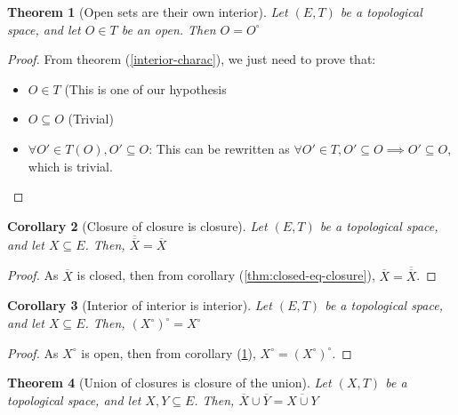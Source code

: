 \documentclass{article}
\newtheorem{theorem}{Theorem}[section]
\newtheorem{corollary}[theorem]{Corollary}
\theoremstyle{definition}
\theoremstyle{remark}
\theoremstyle{example}
\theoremstyle{notation}
\newcommand{\inter}[1]{{{#1}^\circ}}
\begin{document}
\begin{theorem}[Open sets are their own interior] \label{thm:open-eq-interior}
		Let $(E, T)$ be a topological space, and let $O \in T$ be an open. Then $O = \inter{O}$
\end{theorem}

\begin{proof}
		From theorem (\ref{interior-charac}), we just need to prove that:
		\begin{itemize}
				\item $O \in T$ (This is one of our hypothesis
				\item $O \subseteq O$ (Trivial)
				\item $\forall O' \in T(O), O' \subseteq O$: This can be rewritten as $\forall O' \in T, O' \subseteq O \implies O' \subseteq O$, which is trivial.
		\end{itemize}
\end{proof}

\begin{corollary}[Closure of closure is closure]
		Let $(E, T)$ be a topological space, and let $X \subseteq E$. Then, $\overline{\overline{X}} = \overline{X}$ 
\end{corollary}

\begin{proof}
		As $\overline{X}$ is closed, then from corollary (\ref{thm:closed-eq-closure}), $\overline{X} = \overline{\overline{X}}$.
\end{proof}

\begin{corollary}[Interior of interior is interior]
		Let $(E, T)$ be a topological space, and let $X \subseteq E$. Then, $\inter{(\inter{X})} = \inter{X}$
\end{corollary}

\begin{proof}
		As $\inter{X}$ is open, then from corollary (\ref{thm:open-eq-interior}), $\inter{X} = \inter{(\inter{X})}$.
\end{proof}

\begin{theorem}[Union of closures is closure of the union]
		Let $(X, T)$ be a topological space, and let $X, Y \subseteq E$. Then, $\overline{X} \cup \overline{Y} = \overline{X \cup Y}$
\end{theorem}
\end{document}
